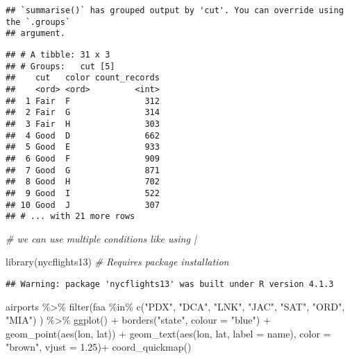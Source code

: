 \documentclass[
]{article}
\newenvironment{Shaded}{\begin{snugshade}}{\end{snugshade}}
\newcommand{\AttributeTok}[1]{\textcolor[rgb]{0.77,0.63,0.00}{#1}}
\newcommand{\CommentTok}[1]{\textcolor[rgb]{0.56,0.35,0.01}{\textit{#1}}}
\newcommand{\FloatTok}[1]{\textcolor[rgb]{0.00,0.00,0.81}{#1}}
\newcommand{\FunctionTok}[1]{\textcolor[rgb]{0.00,0.00,0.00}{#1}}
\newcommand{\NormalTok}[1]{#1}
\newcommand{\SpecialCharTok}[1]{\textcolor[rgb]{0.00,0.00,0.00}{#1}}
\newcommand{\StringTok}[1]{\textcolor[rgb]{0.31,0.60,0.02}{#1}}
\begin{document}
\begin{verbatim}
## `summarise()` has grouped output by 'cut'. You can override using the `.groups`
## argument.
\end{verbatim}

\begin{verbatim}
## # A tibble: 31 x 3
## # Groups:   cut [5]
##    cut   color count_records
##    <ord> <ord>         <int>
##  1 Fair  F               312
##  2 Fair  G               314
##  3 Fair  H               303
##  4 Good  D               662
##  5 Good  E               933
##  6 Good  F               909
##  7 Good  G               871
##  8 Good  H               702
##  9 Good  I               522
## 10 Good  J               307
## # ... with 21 more rows
\end{verbatim}

\begin{Shaded}
\begin{Highlighting}[]
\CommentTok{\# we can use multiple conditions like using |}
\end{Highlighting}
\end{Shaded}

\begin{Shaded}
\begin{Highlighting}[]
\FunctionTok{library}\NormalTok{(nycflights13) }\CommentTok{\# Requires package installation}
\end{Highlighting}
\end{Shaded}

\begin{verbatim}
## Warning: package 'nycflights13' was built under R version 4.1.3
\end{verbatim}

\begin{Shaded}
\begin{Highlighting}[]
\NormalTok{airports }\SpecialCharTok{\%\textgreater{}\%} \FunctionTok{filter}\NormalTok{(faa }\SpecialCharTok{\%in\%} \FunctionTok{c}\NormalTok{(}\StringTok{"PDX"}\NormalTok{, }\StringTok{"DCA"}\NormalTok{, }\StringTok{"LNK"}\NormalTok{, }\StringTok{"JAC"}\NormalTok{, }\StringTok{"SAT"}\NormalTok{, }\StringTok{"ORD"}\NormalTok{, }\StringTok{"MIA"}\NormalTok{) ) }\SpecialCharTok{\%\textgreater{}\%} 
  \FunctionTok{ggplot}\NormalTok{() }\SpecialCharTok{+}
     \FunctionTok{borders}\NormalTok{(}\StringTok{"state"}\NormalTok{, }\AttributeTok{colour =} \StringTok{"blue"}\NormalTok{) }\SpecialCharTok{+}
     \FunctionTok{geom\_point}\NormalTok{(}\FunctionTok{aes}\NormalTok{(lon, lat)) }\SpecialCharTok{+} 
     \FunctionTok{geom\_text}\NormalTok{(}\FunctionTok{aes}\NormalTok{(lon, lat, }\AttributeTok{label =}\NormalTok{ name), }\AttributeTok{color =} \StringTok{"brown"}\NormalTok{, }\AttributeTok{vjust =} \FloatTok{1.25}\NormalTok{)}\SpecialCharTok{+}
     \FunctionTok{coord\_quickmap}\NormalTok{()}
\end{Highlighting}
\end{Shaded}
\end{document}
